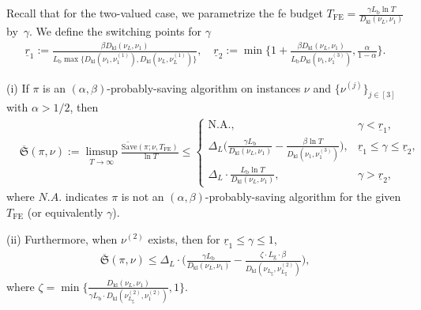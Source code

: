 \documentclass[twoside,11pt]{article}
\newcommand{\kl}{D_{\mathrm{kl}}}
\newcommand{\rmb}{\mathrm{b}}
\newcommand{\rmg}{\mathrm{g}}
\newcommand{\Tfe}{T_{\mathrm{FE}}}
\newcommand{\Saved}{\mathrm{Save}}
\begin{document}
Recall that for the two-valued case, we parametrize the \ac{fe} budget $\Tfe = \frac{\gamma L_{\rmb} \ln T}{\kl(\nu_L,\nu_1)}$ by~$\gamma$.
We define the switching  points for $\gamma$
\begin{align}
      \!\!\underline{r}_1\!:=\! \frac{\beta\kl(\nu_L,\nu_1)}{L_{\rmb}\max\big\{\kl(\nu_1,\nu_1^{(1)}),\kl(\nu_L,\nu_L^{(1)})\big\}}, \quad 
     \underline{r}_2\!:=\! \min\bigg\{ 1 \!+\! \frac{\beta\kl(\nu_L,\nu_1)}{L_{\rmb}\kl(\nu_1,\nu_1^{(3)})},\frac{\alpha}{1-\alpha}\bigg\}.\label{equ:lwbd_two_value_switching}
\end{align}
\begin{theorem}\label{thm:lwbd_2value}
    (i) If $\pi$ is an $(\alpha, \beta)$-probably-saving  algorithm on instances $\nu$ and $\{\nu^{(j)} \}_{j\in[3] }$ with $\alpha>1/2$, then %
    \begin{align}
         &\overline{\mathfrak{S}}(\pi,\nu) :=  \limsup_{T\to\infty}
        \frac{\widetilde{\Saved}(\pi;\nu,\Tfe)}{\ln T}  
    \le\begin{cases}
        \mbox{N.A.},& \gamma  < \underline{r}_1,
        \\
        \Delta_L\Big(
                    \frac{\gamma L_{\rmb}}{\kl(\nu_L,\nu_1)}-\frac{\beta\ln T}{\kl(\nu_1,\nu_1^{(3)})}
                \Big),& \underline{r}_1\leq \gamma  \leq \underline{r}_2,\!\!
        \\
        \Delta_L \cdot  \frac{L_{\rmb}\ln T}{\kl(\nu_L,\nu_1)},& \gamma  > \underline{r}_2,
    \end{cases}
\end{align}
where $N.A.$ indicates $\pi$ is not an $(\alpha, \beta)$-probably-saving algorithm for the given $\Tfe$ (or equivalently $\gamma$).

\noindent (ii) Furthermore, when $\nu^{(2)}$ exists, then 
for $\underline{r}_1\leq \gamma  \leq 1$, %
\begin{align}\label{equ:two_value_less}
    \overline{\mathfrak{S}}(\pi,\nu)\le\Delta_L \cdot \bigg(
             \frac{\gamma L_{\rmb}}{\kl(\nu_L,\nu_1)}-
            \frac{\zeta\cdot L_{\rmg}\cdot \beta}{\kl(\nu_{L_{\rmg}},\nu_{L_{\rmg}}^{(2)})}
        \bigg),
\end{align}
where $\zeta=\min\Big\{\frac{\kl(\nu_L,\nu_1)}{\gamma L_{\rmb}\cdot \kl(\nu_{L_{\rmg}}^{(2)},\nu_{1}^{(2)}) },1\Big\}$.
\end{theorem}
\end{document}

